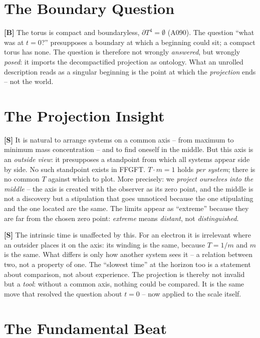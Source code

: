 \section{The Boundary Question}

\textbf{[B]} The torus is compact and boundaryless, $\partial T^4=\emptyset$ (A090).
The question ``what was at $t=0$?'' presupposes a boundary at which a beginning
could sit; a compact torus has none. The question is therefore not wrongly
\emph{answered}, but wrongly \emph{posed}: it imports the decompactified
projection as ontology. What an unrolled description reads as a singular beginning
is the point at which the \emph{projection} ends -- not the world.

\section{The Projection Insight}

\textbf{[S]} It is natural to arrange systems on a common axis -- from maximum
to minimum mass concentration -- and to find oneself in the middle. But this
axis is an \emph{outside view}: it presupposes a standpoint from which all
systems appear side by side. No such standpoint exists in FFGFT. $T\cdot m=1$
holds \emph{per system}; there is no common $T$ against which to plot. More
precisely: we \emph{project ourselves into the middle} -- the axis is created
with the observer as its zero point, and the middle is not a discovery but a
stipulation that goes unnoticed because the one stipulating and the one located
are the same. The limits appear as ``extreme'' because they are far from the
chosen zero point: \emph{extreme} means \emph{distant}, not \emph{distinguished}.

\textbf{[S]} The intrinsic time is unaffected by this. For an electron it is
irrelevant where an outsider places it on the axis: its winding is the same,
because $T=1/m$ and $m$ is the same. What differs is only how another system
sees it -- a relation between two, not a property of one. The ``slowest time''
at the horizon too is a statement about comparison, not about experience. The
projection is thereby not invalid but a \emph{tool}: without a common axis,
nothing could be compared. It is the same move that resolved the question about
$t=0$ -- now applied to the scale itself.

\section{The Fundamental Beat}

